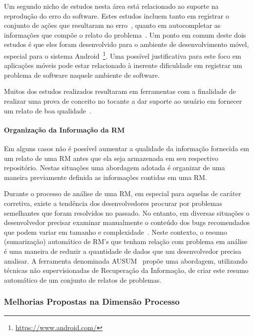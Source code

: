 Um segundo nicho de estudos  nesta área está relacionado ao suporte na
reprodução do erro do software. Estes estudos incluem tanto em registrar o
conjunto de ações que resultaram no erro~\cite{White:2015:GRR:2820282.2820291},
quanto em autocompletar as informações que compõe o relato do
problema~\cite{moran2015auto}. Um ponto em comum deste dois estudos é que eles
foram desenvolvido para o ambiente de desenvolvimento móvel, especial para o
sistema Android~\footnote{\url{https://www.android.com/}}. Uma possível
justificativa para este foco em aplicações móveis pode estar relacionado à
inerente dificuldade em registrar um problema de software naquele ambiente de
software.

Muitos dos estudos realizados resultaram em ferramentas com a finalidade de
realizar uma prova de conceito no tocante a dar suporte ao usuário em fornecer
um relato de boa qualidade~\cite{Tu:2014:MQI:2677832.2677844, Bettenburg2008a,
	Wu2011a,White:2015:GRR:2820282.2820291,moran2015auto}. 

\paragraph{Organização da Informação da RM}

Em alguns casos não é possível aumentar a qualidade da informação fornecida
em um relato de uma RM antes que ela seja armazenada em seu respectivo
repositório.  Nestas situações uma abordagem adotada é organizar de uma
maneira previamente definida as informações contidas em uma RM\@.

Durante o processo de análise de uma RM, em especial para aquelas de caráter
corretiva, existe a tendência dos desenvolvedores procurar por problemas
semelhantes que foram resolvidos no passado. No entanto, em diversas situações o
desenvolvedor precisar examinar manualmente o conteúdo dos bugs recomendados que
podem variar em tamanho e complexidade~\cite{mani2012ausum}.  Neste contexto, o
resumo (sumarização) automático de RM's que tenham relação com problema em
análise é uma maneira de reduzir a quantidade de dados que um desenvolvedor
precisa analisar. A ferramenta denominada AUSUM~\cite{mani2012ausum} propõe uma
abordagem, utilizando técnicas não supervisionadas de Recuperação da Informação,
de criar este resumo automático de um conjunto de relatos de problemas.

\subsubsection{Melhorias Propostas na Dimensão Processo}
\label{ssub:melhorias_dim_processo}

